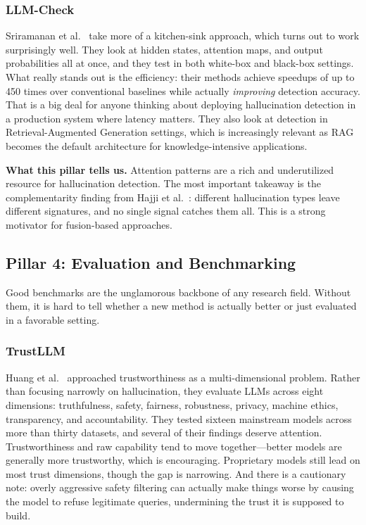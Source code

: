 \documentclass[journal]{IEEEtran}
\begin{document}
\subsubsection{LLM-Check}
Sriramanan et al.~\cite{llmcheck} take more of a kitchen-sink approach, which turns out to work surprisingly well. They look at hidden states, attention maps, and output probabilities all at once, and they test in both white-box and black-box settings. What really stands out is the efficiency: their methods achieve speedups of up to 450 times over conventional baselines while actually \emph{improving} detection accuracy. That is a big deal for anyone thinking about deploying hallucination detection in a production system where latency matters. They also look at detection in Retrieval-Augmented Generation settings, which is increasingly relevant as RAG becomes the default architecture for knowledge-intensive applications.

\textbf{What this pillar tells us.} Attention patterns are a rich and underutilized resource for hallucination detection. The most important takeaway is the complementarity finding from Hajji et al.~\cite{map_misbelief}: different hallucination types leave different signatures, and no single signal catches them all. This is a strong motivator for fusion-based approaches.

\subsection{Pillar 4: Evaluation and Benchmarking}

Good benchmarks are the unglamorous backbone of any research field. Without them, it is hard to tell whether a new method is actually better or just evaluated in a favorable setting.

\subsubsection{TrustLLM}
Huang et al.~\cite{trustllm} approached trustworthiness as a multi-dimensional problem. Rather than focusing narrowly on hallucination, they evaluate LLMs across eight dimensions: truthfulness, safety, fairness, robustness, privacy, machine ethics, transparency, and accountability. They tested sixteen mainstream models across more than thirty datasets, and several of their findings deserve attention. Trustworthiness and raw capability tend to move together---better models are generally more trustworthy, which is encouraging. Proprietary models still lead on most trust dimensions, though the gap is narrowing. And there is a cautionary note: overly aggressive safety filtering can actually make things worse by causing the model to refuse legitimate queries, undermining the trust it is supposed to build.
\end{document}
